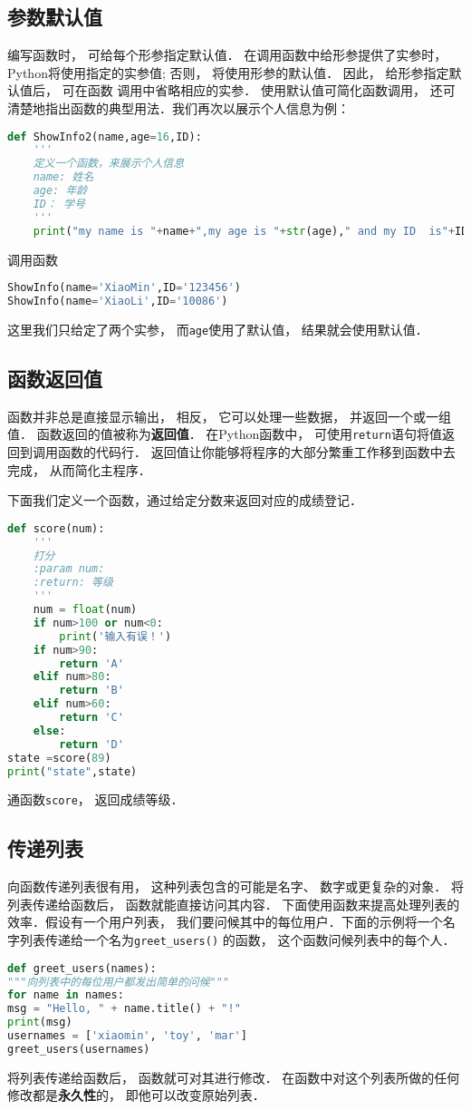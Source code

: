 \subsection{参数默认值}
编写函数时， 可给每个形参指定默认值． 在调用函数中给形参提供了实参时， Python将使用指定的实参值; 否则， 将使用形参的默认值． 因此， 给形参指定默认值后， 可在函数
调用中省略相应的实参． 使用默认值可简化函数调用， 还可清楚地指出函数的典型用法．我们再次以展示个人信息为例：
\begin{lstlisting}[language=python]
def ShowInfo2(name,age=16,ID):
    '''
    定义一个函数，来展示个人信息
    name: 姓名
    age: 年龄
    ID： 学号
    '''
    print("my name is "+name+",my age is "+str(age)," and my ID  is"+ID)
\end{lstlisting}
调用函数
\begin{lstlisting}[language=python]
ShowInfo(name='XiaoMin',ID='123456')
ShowInfo(name='XiaoLi',ID='10086')
\end{lstlisting}
这里我们只给定了两个实参， 而\verb|age|使用了默认值， 结果就会使用默认值．

\subsection{函数返回值}
函数并非总是直接显示输出， 相反， 它可以处理一些数据， 并返回一个或一组值． 函数返回的值被称为\textbf{返回值}． 在Python函数中， 可使用\verb|return|语句将值返回到调用函数的代码行． 返回值让你能够将程序的大部分繁重工作移到函数中去完成， 从而简化主程序．

下面我们定义一个函数，通过给定分数来返回对应的成绩登记．
\begin{lstlisting}[language=python]
def score(num):
    '''
    打分
    :param num:
    :return: 等级
    '''
    num = float(num)
    if num>100 or num<0:
        print('输入有误！')
    if num>90:
        return 'A'
    elif num>80:
        return 'B'
    elif num>60:
        return 'C'
    else:
        return 'D'
state =score(89)
print("state",state)
\end{lstlisting}
通函数\verb|score|， 返回成绩等级．

\subsection{传递列表}
向函数传递列表很有用， 这种列表包含的可能是名字、 数字或更复杂的对象． 将列表传递给函数后， 函数就能直接访问其内容． 下面使用函数来提高处理列表的效率．假设有一个用户列表， 我们要问候其中的每位用户．下面的示例将一个名字列表传递给一个名为\verb|greet_users()| 的函数， 这个函数问候列表中的每个人．
\begin{lstlisting}[language=python]
def greet_users(names):
"""向列表中的每位用户都发出简单的问候"""
for name in names:
msg = "Hello, " + name.title() + "!"
print(msg)
usernames = ['xiaomin', 'toy', 'mar']
greet_users(usernames)
\end{lstlisting}
将列表传递给函数后， 函数就可对其进行修改． 在函数中对这个列表所做的任何修改都是\textbf{永久性}的， 即他可以改变原始列表．

